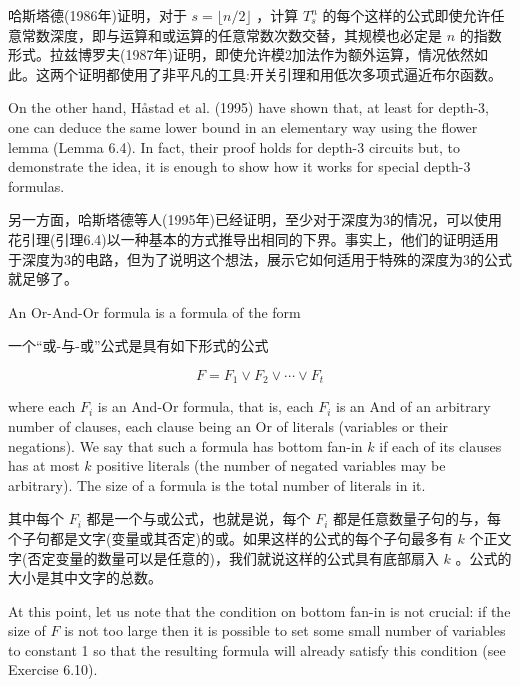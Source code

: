 \documentclass[10pt]{article}
\begin{document}
\begin{tcolorbox}\relax
哈斯塔德(1986年)证明，对于 \(s = \lfloor n/2\rfloor\) ，计算 \({T}_{s}^{n}\) 的每个这样的公式即使允许任意常数深度，即与运算和或运算的任意常数次数交替，其规模也必定是 \(n\) 的指数形式。拉兹博罗夫(1987年)证明，即使允许模2加法作为额外运算，情况依然如此。这两个证明都使用了非平凡的工具:开关引理和用低次多项式逼近布尔函数。
\end{tcolorbox}

On the other hand, Håstad et al. (1995) have shown that, at least for depth-3, one can deduce the same lower bound in an elementary way using the flower lemma (Lemma 6.4). In fact, their proof holds for depth-3 circuits but, to demonstrate the idea, it is enough to show how it works for special depth-3 formulas.

\begin{tcolorbox}\relax
另一方面，哈斯塔德等人(1995年)已经证明，至少对于深度为3的情况，可以使用花引理(引理6.4)以一种基本的方式推导出相同的下界。事实上，他们的证明适用于深度为3的电路，但为了说明这个想法，展示它如何适用于特殊的深度为3的公式就足够了。
\end{tcolorbox}

An Or-And-Or formula is a formula of the form

\begin{tcolorbox}\relax
一个“或-与-或”公式是具有如下形式的公式
\end{tcolorbox}

\[
F = {F}_{1} \vee  {F}_{2} \vee  \cdots  \vee  {F}_{t} \tag{6.4}
\]

where each \({F}_{i}\) is an And-Or formula, that is, each \({F}_{i}\) is an And of an arbitrary number of clauses, each clause being an Or of literals (variables or their negations). We say that such a formula has bottom fan-in \(k\) if each of its clauses has at most \(k\) positive literals (the number of negated variables may be arbitrary). The size of a formula is the total number of literals in it.

\begin{tcolorbox}\relax
其中每个 \({F}_{i}\) 都是一个与或公式，也就是说，每个 \({F}_{i}\) 都是任意数量子句的与，每个子句都是文字(变量或其否定)的或。如果这样的公式的每个子句最多有 \(k\) 个正文字(否定变量的数量可以是任意的)，我们就说这样的公式具有底部扇入 \(k\) 。公式的大小是其中文字的总数。
\end{tcolorbox}

At this point, let us note that the condition on bottom fan-in is not crucial: if the size of \(F\) is not too large then it is possible to set some small number of variables to constant 1 so that the resulting formula will already satisfy this condition (see Exercise 6.10).
\end{document}

